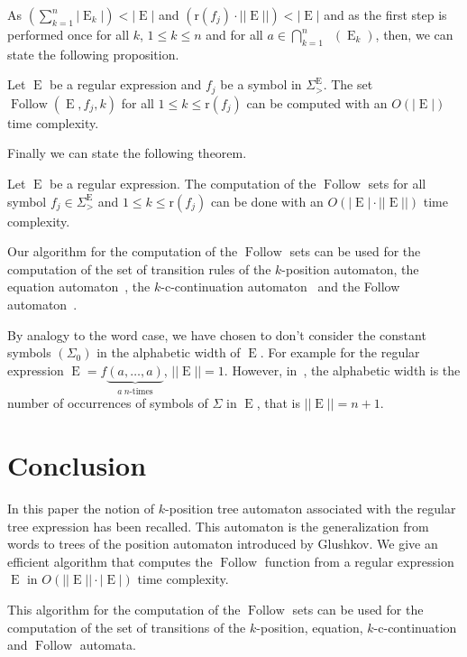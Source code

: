 \documentclass{llncs}
\DeclareMathOperator{\Follow}{Follow}
\DeclareMathOperator{\E}{E}
\DeclareMathOperator{\Firs}{Fr_0}
\def\firs#1{\Firs{(#1)}}
\begin{document}
\noindent As $\displaystyle(\sum^n_{k=1}|\E_k|)<|\E|$ and $(\mathrm{r}(f_j)\cdot||\E||)<|\E|$ and as the first step is performed once for all $k$, $1\leq k\leq n$ and for all $a\in\displaystyle\bigcap^n_{k=1} \firs{\E_k}$, then, we can state the following proposition.
\begin{proposition}    
Let $\E$ be a regular expression and $f_j$ be a symbol in $\Sigma^{\E}_{>}$. The set $\Follow(\E,f_j,k)$ for all $1\leq k\leq \mathrm{r}(f_j)$ can be computed with an $O(|\E|)$ time complexity. 
\end{proposition}    

Finally we can state the following theorem.

\begin{theorem}
Let $\E$ be a regular expression. The computation of the $\Follow$ sets for all symbol $f_j\in\Sigma^{\E}_{>}$ and $1\leq k\leq \mathrm{r}(f_j)$ can be done with an $O(|\E|\cdot||\E||)$ time complexity.
\end{theorem}
Our algorithm for the computation of the $\Follow$ sets can be used for the computation of the set of transition rules of the $k$-position automaton, the equation automaton~\cite{automate2,cie}, the $k$-c-continuation automaton~\cite{cie,arxiv} and the Follow automaton~\cite{arxiv}. 
\begin{remark} 
By analogy to the word case, we have chosen to don't consider the constant symbols $(\Sigma_0)$ in the alphabetic width of $\E$. For example for the regular expression $\E=f\underbrace{(a,\ldots,a)}_{a \ n\mbox{-times}}$, $||\E||=1$. However, in~\cite{automate2}, the alphabetic width is the number of occurrences of symbols of $\Sigma$ in $\E$, that is $||\E||=n+1$.   
\end{remark}

\section{Conclusion}
In this paper the notion of $k$-position tree automaton associated with the regular
tree expression has been recalled. This automaton is the generalization from words to trees of the position automaton introduced by Glushkov. We give an efficient algorithm that computes the $\Follow$ function from a regular expression $\E$ in $O(||\E||\cdot |\E|)$ time complexity. 

This algorithm for the computation of the $\Follow$ sets can be used for the computation of the set of transitions of the $k$-position, equation, $k$-c-continuation and $\Follow$ automata.  



\end{document}

